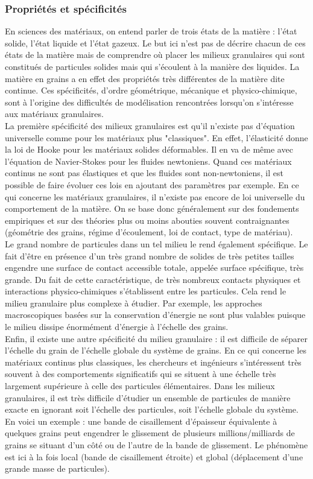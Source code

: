 		\subsubsection{Propriétés et spécificités}
			En sciences des matériaux, on entend parler de trois états de la matière : l'état solide, l'état liquide et l'état gazeux. Le but ici n'est pas de décrire chacun de ces états de la matière mais de comprendre où placer les milieux granulaires qui sont constitués de particules solides mais qui s'écoulent à la manière des liquides. La matière en grains a en effet des propriétés très différentes de la matière dite continue. Ces spécificités, d'ordre géométrique, mécanique et physico-chimique, sont à l'origine des difficultés de modélisation rencontrées lorsqu'on s'intéresse aux matériaux granulaires.
			\\La première spécificité des milieux granulaires est qu'il n'existe pas d'équation universelle comme pour les matériaux plus "classiques". En effet, l'élasticité donne la loi de Hooke pour les matériaux solides déformables. Il en va de même avec l'équation de Navier-Stokes pour les fluides newtoniens. Quand ces matériaux continus ne sont pas élastiques et que les fluides sont non-newtoniens, il est possible de faire évoluer ces lois en ajoutant des paramètres par exemple. En ce qui concerne les matériaux granulaires, il n'existe pas encore de loi universelle du comportement de la matière. On se base donc généralement sur des fondements empiriques et sur des théories plus ou moins abouties souvent contraignantes (géométrie des grains, régime d'écoulement, loi de contact, type de matériau).
			\\Le grand nombre de particules dans un tel milieu le rend également spécifique. Le fait d'être en présence d'un très grand nombre de solides de très petites tailles engendre une surface de contact accessible totale, appelée surface spécifique, très grande. Du fait de cette caractéristique, de très nombreux contacts physiques et interactions physico-chimiques s'établissent entre les particules. Cela rend le milieu granulaire plus complexe à étudier. Par exemple, les approches macroscopiques basées sur la conservation d'énergie ne sont plus valables puisque le milieu dissipe énormément d'énergie à l'échelle des grains.
			\\Enfin, il existe une autre spécificité du milieu granulaire : il est difficile de séparer l'échelle du grain de l'échelle globale du système de grains. En ce qui concerne les matériaux continus plus classiques, les chercheurs et ingénieurs s'intéressent très souvent à des comportements significatifs qui se situent à une échelle très largement supérieure à celle des particules élémentaires. Dans les milieux granulaires, il est très difficile d'étudier un ensemble de particules de manière exacte en ignorant soit l'échelle des particules, soit l'échelle globale du système. En voici un exemple : une bande de cisaillement d'épaisseur équivalente à quelques grains peut engendrer le glissement de plusieurs millions/milliards de grains se situant d'un côté ou de l'autre de la bande de glissement. Le phénomène est ici à la fois local (bande de cisaillement étroite) et global (déplacement d'une grande masse de particules).
